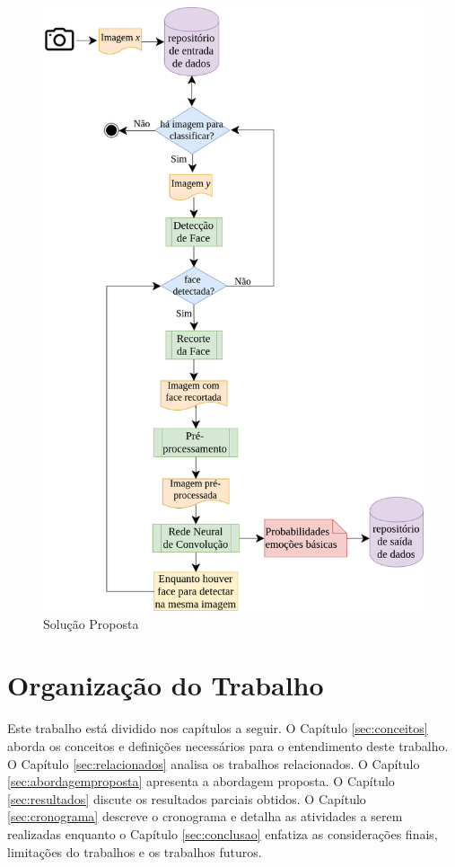 \begin{figure}
\centering
\includegraphics[scale=0.45]{figuras/arquitetura.png}
\caption{Solução Proposta}
\label{fig:arquitetura}
\end{figure}

\section{Organização do Trabalho}
Este trabalho está dividido nos capítulos a seguir. O Capítulo \ref{sec:conceitos} aborda os conceitos e definições necessários para o entendimento deste trabalho. O Capítulo \ref{sec:relacionados} analisa os trabalhos relacionados. O Capítulo \ref{sec:abordagemproposta} apresenta a abordagem proposta. O Capítulo \ref{sec:resultados} discute os resultados parciais obtidos. O Capítulo \ref{sec:cronograma} descreve o cronograma e detalha as atividades a serem realizadas enquanto o Capítulo \ref{sec:conclusao} enfatiza as considerações finais, limitações do trabalhos e os trabalhos futuros.